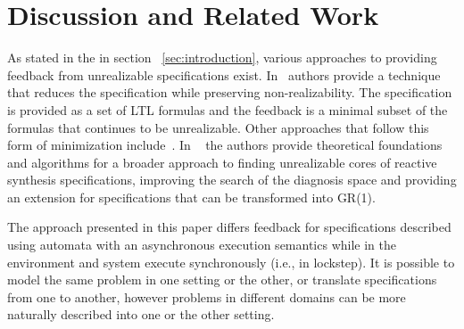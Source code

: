 \section{Discussion and Related Work}\label{sec:discussion}

As stated in the in section ~\ref{sec:introduction}, various approaches to providing feedback from unrealizable specifications exist. In~\cite{DBLP:conf/fmcad/KonighoferHB09} authors provide a technique that reduces the specification while preserving non-realizability. The specification is provided as a set of LTL formulas and the feedback is a minimal subset of the formulas that continues to be unrealizable. Other approaches that follow this form of minimization include~\cite{DBLP:journals/scp/Schuppan12}. In ~\cite{maoz2021unrealizable} the authors provide theoretical foundations and algorithms for a broader approach to finding unrealizable cores of reactive synthesis specifications, improving the search of the diagnosis space and providing an extension for specifications that can be transformed into GR(1).
 
The approach presented in this paper differs feedback for specifications described using automata with an asynchronous execution semantics while in \cite{DBLP:conf/fmcad/KonighoferHB09} the environment and system execute synchronously (i.e., in lockstep). It is possible to model the same problem in one setting or the other, or translate specifications from one to another, however problems in different domains can  be more naturally described into one or the other setting.

